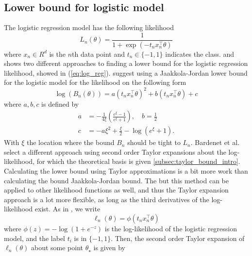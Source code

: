 \subsection{Lower bound for logistic model}
The logistic regression model has the following likelihood 
\begin{equation}\label{eq:log_reg}
    L_n\left(\theta\right) = \frac{1}{1 + \exp\left(-t_n x_n^{\top}\theta \right)} 
\end{equation}
where $x_n \in R^d$ is the $n$th data point and $t_n\in \{-1, 1\}$ indicates the class. 
\cite{Maclaurin:1} and \cite{Bardenet:1} shows two different approaches to finding a lower bound for the logistic regression likelihood, showed in (\ref{eq:log_reg}). 
\cite{Maclaurin:1} suggest using a Jaakkola-Jordan lower bound for the logistic model for the likelihood on the following form 
\begin{equation}\label{eq:Jakkola_bound}
    \log\left(B_n\left(\theta\right)\right) = a\left(t_n x_n^{\top} \theta\right)^2 + b\left(t_n x_n ^{\top}\theta \right) + c
\end{equation}
where $a,b,c$ is defined by
\begin{equation}
\begin{split}
    a &= -\frac{1}{4\xi}\left(\frac{e^{\xi} - 1}{e^{\xi} + 1}\right), \quad b = \frac{1}{2} \\
    c &= -a\xi^2 + \frac{\xi}{2} - \log\left(e^{\xi} + 1\right). 
\end{split}
\end{equation}
With $\xi$ the location where the bound $B_n$ should be tight to $L_n$. 
Bardenet et al. select a different approach using second order Taylor expansions about the log-likelihood, for which the theoretical basis is given \ref{subsec:taylor_bound_intro}. Calculating the lower bound using Taylor approximations is a bit more work than calculating the bound Jaakkola-Jordan bound. The  but this method can be applied to other likelihood functions as well, and thus the Taylor expansion approach is a lot more flexible, as long as the third derivatives of the log-likelihood exist. As in \cite{Bardenet:1}, we write
\begin{equation}\label{eq:logist_log_likelihood}
\ell_n(\theta) = \phi\left(t_n x_n^{\top}\theta \right)
\end{equation}
where $\phi(z) = -\log\left( 1  + e^{-z}\right)$ is the log-likelihood of the logistic regression model, and the label $t_i$ is in $\{-1, 1\}$. Then, the second order Taylor expansion of $\ell_n\left(\theta\right)$ about some point $\theta_{\star}$ is given by
